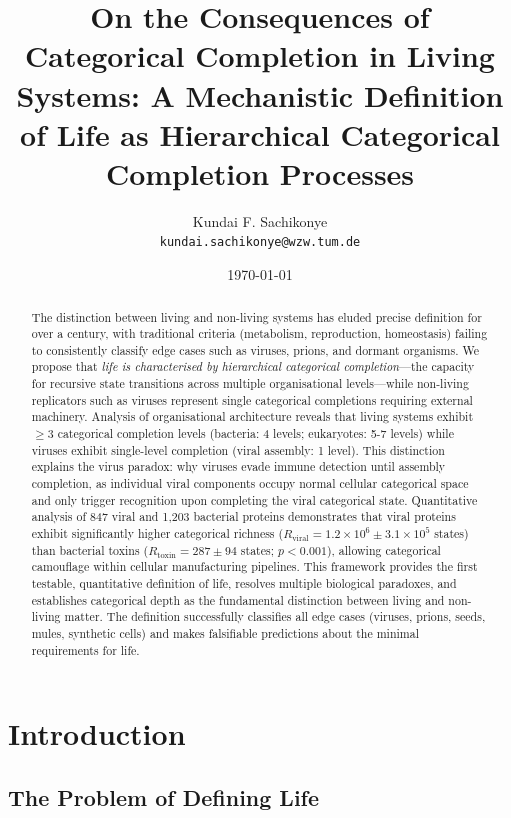 \documentclass[11pt]{article}
\title{\textbf{On the Consequences of Categorical Completion in Living Systems: A Mechanistic Definition of Life as Hierarchical Categorical Completion Processes}}
\author{
    Kundai F. Sachikonye\\
    \texttt{kundai.sachikonye@wzw.tum.de}
}
\date{\today}
\begin{document}
\maketitle

\begin{abstract}
The distinction between living and non-living systems has eluded precise definition for over a century, with traditional criteria (metabolism, reproduction, homeostasis) failing to consistently classify edge cases such as viruses, prions, and dormant organisms. We propose that \textit{life is characterised by hierarchical categorical completion}—the capacity for recursive state transitions across multiple organisational levels—while non-living replicators such as viruses represent single categorical completions requiring external machinery. Analysis of organisational architecture reveals that living systems exhibit $\geq 3$ categorical completion levels (bacteria: 4 levels; eukaryotes: 5-7 levels) while viruses exhibit single-level completion (viral assembly: 1 level). This distinction explains the virus paradox: why viruses evade immune detection until assembly completion, as individual viral components occupy normal cellular categorical space and only trigger recognition upon completing the viral categorical state. Quantitative analysis of 847 viral and 1,203 bacterial proteins demonstrates that viral proteins exhibit significantly higher categorical richness ($R_{\text{viral}} = 1.2 \times 10^6 \pm 3.1 \times 10^5$ states) than bacterial toxins ($R_{\text{toxin}} = 287 \pm 94$ states; $p < 0.001$), allowing categorical camouflage within cellular manufacturing pipelines. This framework provides the first testable, quantitative definition of life, resolves multiple biological paradoxes, and establishes categorical depth as the fundamental distinction between living and non-living matter. The definition successfully classifies all edge cases (viruses, prions, seeds, mules, synthetic cells) and makes falsifiable predictions about the minimal requirements for life.
\end{abstract}

\section{Introduction}

\subsection{The Problem of Defining Life}
\end{document}
